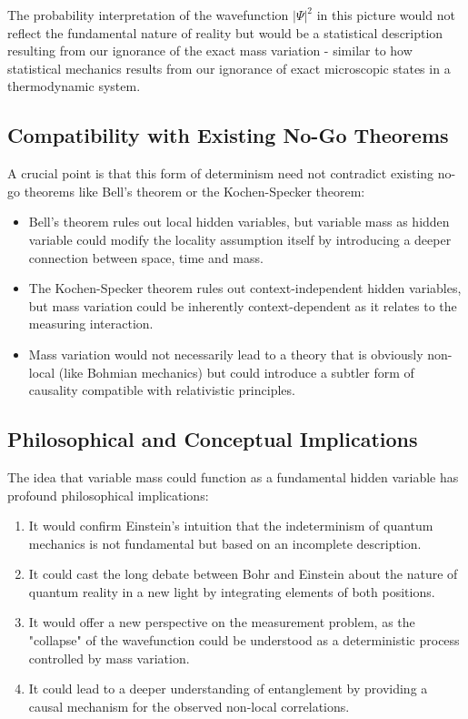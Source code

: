 \documentclass[12pt,a4paper]{article}  %
\begin{document}
	The probability interpretation of the wavefunction $|\Psi|^2$ in this picture would not reflect the fundamental nature of reality but would be a statistical description resulting from our ignorance of the exact mass variation - similar to how statistical mechanics results from our ignorance of exact microscopic states in a thermodynamic system.
	
	\subsection{Compatibility with Existing No-Go Theorems}
	
	A crucial point is that this form of determinism need not contradict existing no-go theorems like Bell's theorem or the Kochen-Specker theorem:
	
	\begin{itemize}
		\item Bell's theorem rules out local hidden variables, but variable mass as hidden variable could modify the locality assumption itself by introducing a deeper connection between space, time and mass.
		
		\item The Kochen-Specker theorem rules out context-independent hidden variables, but mass variation could be inherently context-dependent as it relates to the measuring interaction.
		
		\item Mass variation would not necessarily lead to a theory that is obviously non-local (like Bohmian mechanics) but could introduce a subtler form of causality compatible with relativistic principles.
	\end{itemize}
	
	\subsection{Philosophical and Conceptual Implications}
	
	The idea that variable mass could function as a fundamental hidden variable has profound philosophical implications:
	
	\begin{enumerate}
		\item It would confirm Einstein's intuition that the indeterminism of quantum mechanics is not fundamental but based on an incomplete description.
		
		\item It could cast the long debate between Bohr and Einstein about the nature of quantum reality in a new light by integrating elements of both positions.
		
		\item It would offer a new perspective on the measurement problem, as the "collapse" of the wavefunction could be understood as a deterministic process controlled by mass variation.
		
		\item It could lead to a deeper understanding of entanglement by providing a causal mechanism for the observed non-local correlations.
	\end{enumerate}
	
\end{document}

